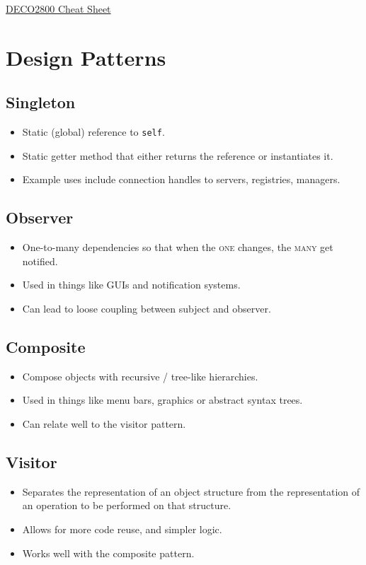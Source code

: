 \documentclass[landscape]{cheat}
\begin{document}
\footnotesize
\begin{multicols*}{3}

\begin{center}
\Large{\underline{DECO2800 Cheat Sheet}} \\
\end{center}

\section{Design Patterns}

\subsection{Singleton}
\begin{itemize}
    \item Static (global) reference to \texttt{self}.
    \item Static getter method that either returns the reference or instantiates it.
    \item Example uses include connection handles to servers, registries, managers.
\end{itemize}

\subsection{Observer}
\begin{itemize}
    \item One-to-many dependencies so that when the \textsc{one} changes, the \textsc{many} get notified.
    \item Used in things like GUIs and notification systems.
    \item Can lead to loose coupling between subject and observer.
\end{itemize}

\subsection{Composite}
\begin{itemize}
    \item Compose objects with recursive / tree-like hierarchies.
    \item Used in things like menu bars, graphics or abstract syntax trees.
    \item Can relate well to the visitor pattern.
\end{itemize}

\subsection{Visitor}
\begin{itemize}
    \item Separates the representation of an object structure from the representation of an operation to be performed on that structure.
    \item Allows for more code reuse, and simpler logic.
    \item Works well with the composite pattern.
\end{itemize}


\end{multicols*}
\end{document}
